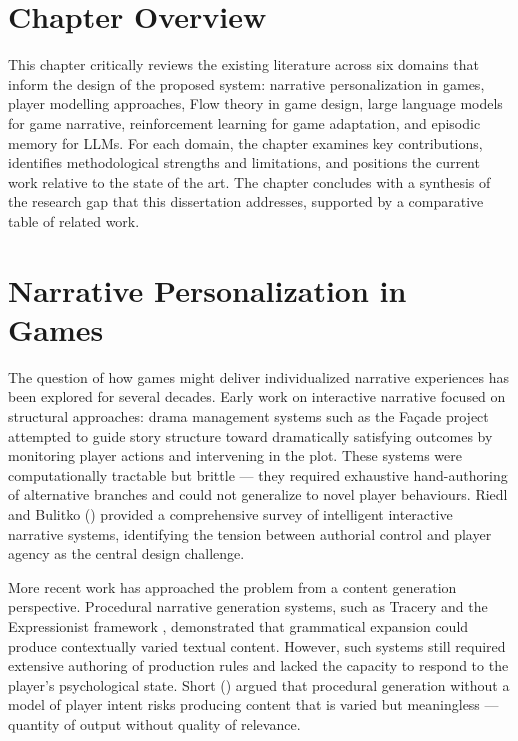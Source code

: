 \documentclass[12pt,a4paper]{report}
\begin{document}
\section{Chapter Overview}

This chapter critically reviews the existing literature across six domains that inform the design of the proposed system: narrative personalization in games, player modelling approaches, Flow theory in game design, large language models for game narrative, reinforcement learning for game adaptation, and episodic memory for LLMs. For each domain, the chapter examines key contributions, identifies methodological strengths and limitations, and positions the current work relative to the state of the art. The chapter concludes with a synthesis of the research gap that this dissertation addresses, supported by a comparative table of related work.

\section{Narrative Personalization in Games}

The question of how games might deliver individualized narrative experiences has been explored for several decades. Early work on interactive narrative focused on structural approaches: drama management systems such as the Fa\c{c}ade project \citep{mateas2003facade} attempted to guide story structure toward dramatically satisfying outcomes by monitoring player actions and intervening in the plot. These systems were computationally tractable but brittle --- they required exhaustive hand-authoring of alternative branches and could not generalize to novel player behaviours. Riedl and Bulitko (\citeyear{riedl2013interactive}) provided a comprehensive survey of intelligent interactive narrative systems, identifying the tension between authorial control and player agency as the central design challenge.

More recent work has approached the problem from a content generation perspective. Procedural narrative generation systems, such as Tracery \citep{compton2015tracery} and the Expressionist framework \citep{kreminski2019evaluating}, demonstrated that grammatical expansion could produce contextually varied textual content. However, such systems still required extensive authoring of production rules and lacked the capacity to respond to the player's psychological state. Short (\citeyear{short2019procedural}) argued that procedural generation without a model of player intent risks producing content that is varied but meaningless --- quantity of output without quality of relevance.
\end{document}
